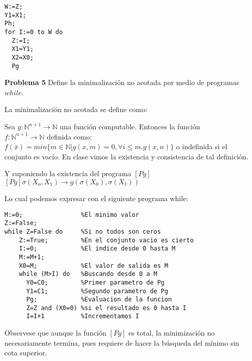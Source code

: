 \documentclass{article}
\begin{document}
\begin{enumerate}
\begin{lstlisting}[frame=single] 
W:=Z;
Y1=X1;
Ph;
for I:=0 to W do
  Z:=I;
  X1=Y1;
  X2=X0;
  Pg
\end{lstlisting}

\newpage
\item[\bf{Problema 5}] Define la minimalización no acotada por medio de programas $while$.

La minimalización no acotada se define como:


Sea $ g: \mathbb{N}^{n+1} \rightarrow  \mathbb{N} $ una función computable.
Entonces la función\\
$f: \mathbb{N}^{n+1} \rightarrow \mathbb{N}$ definida como:\\
$f(\bar x)= min\{m \in \mathbb{N} |g(x,m)=0, \forall i \le m . g(x,n) \}$
o indefinida si el conjunto es vacío. En clase vimos la existencia y consistencia de tal definición.

Y suponiendo la existencia del programa $[Pg]$\\
$[Pg]\sigma(X_o,X_1) \rightarrow g(\sigma(X_0),\sigma(X_1))$

Lo cual podemos expresar con el siguiente programa while:\\

\begin{lstlisting}[frame=single] 
M:=0;                %El minimo valor
Z:=False;           
while Z=False do     %Si no todos son ceros
    Z:=True;         %En el conjunto vacio es cierto
    I:=0;            %El indice desde 0 hasta M
    M:=M+1;         
    X0=M;            %El valor de salida es M 
    while (M>I) do   %Buscando desde 0 a M
      Y0=C0;         %Primer parametro de Pg
      Y1=C1;         %Segundo parametro de Pg
      Pg;            %Evaluacion de la funcion       
      Z=Z and (X0=0) %si el resultado es 0 hasta I
      I=I+1          %Incrementamos I
\end{lstlisting}
Observese que aunque la función $[Pg]$ es total, la minimización no necesariamente termina, pues requiere de hacer la búsqueda del mínimo sin cota superior.
\end{enumerate}
\end{document}
